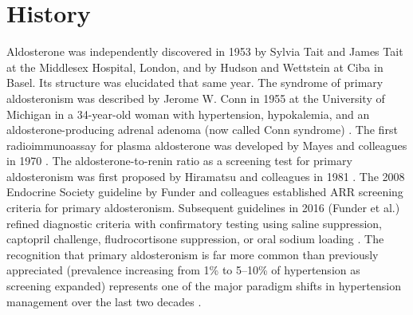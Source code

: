 \section*{History}
Aldosterone was independently discovered in 1953 by Sylvia Tait and James Tait at the Middlesex Hospital, London, and by Hudson and Wettstein at Ciba in Basel. Its structure was elucidated that same year. The syndrome of primary aldosteronism was described by Jerome W. Conn in 1955 at the University of Michigan in a 34-year-old woman with hypertension, hypokalemia, and an aldosterone-producing adrenal adenoma (now called Conn syndrome) \cite{conn1955primary}. The first radioimmunoassay for plasma aldosterone was developed by Mayes and colleagues in 1970 \cite{mayes1970radioimmunoassay}. The aldosterone-to-renin ratio as a screening test for primary aldosteronism was first proposed by Hiramatsu and colleagues in 1981 \cite{hiramatsu1981screening}. The 2008 Endocrine Society guideline by Funder and colleagues established ARR screening criteria for primary aldosteronism. Subsequent guidelines in 2016 (Funder et al.) refined diagnostic criteria with confirmatory testing using saline suppression, captopril challenge, fludrocortisone suppression, or oral sodium loading \cite{funder2016management}. The recognition that primary aldosteronism is far more common than previously appreciated (prevalence increasing from 1\% to 5--10\% of hypertension as screening expanded) represents one of the major paradigm shifts in hypertension management over the last two decades \cite{young2007primary, mulatero2004increased}.

